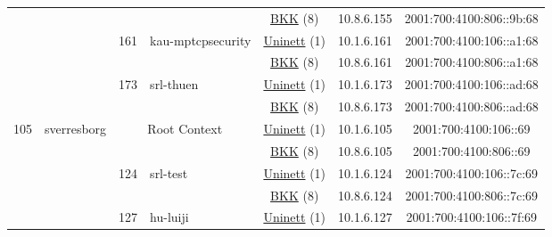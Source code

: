 \begin{small}
\begin{center}
\begin{longtable}{|c|c|c|c|c|c|c|c|}
  &  &  &  & \multicolumn{2}{|c|}{\tiny{\href{http://bkk.no}{BKK} (8)}} & \tiny{10.8.6.155} & \tiny{2001:700:4100:806::9b:68} \\* \cline{3-3}\cline{4-4}\cline{5-5}\cline{6-6}\cline{7-7}\cline{8-8}
  &  & \multirow{2}{*}{\tiny{161}} & \multicolumn{1}{|l|}{\multirow{2}{*}{\tiny{kau-mptcpsecurity}}} & \multicolumn{2}{|c|}{\tiny{\href{https://www.uninett.no}{Uninett} (1)}} & \tiny{10.1.6.161} & \tiny{2001:700:4100:106::a1:68} \\* \cline{5-5}\cline{6-6}\cline{7-7}\cline{8-8}
  &  &  &  & \multicolumn{2}{|c|}{\tiny{\href{http://bkk.no}{BKK} (8)}} & \tiny{10.8.6.161} & \tiny{2001:700:4100:806::a1:68} \\* \cline{3-3}\cline{4-4}\cline{5-5}\cline{6-6}\cline{7-7}\cline{8-8}
  &  & \multirow{2}{*}{\tiny{173}} & \multicolumn{1}{|l|}{\multirow{2}{*}{\tiny{srl-thuen}}} & \multicolumn{2}{|c|}{\tiny{\href{https://www.uninett.no}{Uninett} (1)}} & \tiny{10.1.6.173} & \tiny{2001:700:4100:106::ad:68} \\* \cline{5-5}\cline{6-6}\cline{7-7}\cline{8-8}
  &  &  &  & \multicolumn{2}{|c|}{\tiny{\href{http://bkk.no}{BKK} (8)}} & \tiny{10.8.6.173} & \tiny{2001:700:4100:806::ad:68} \\ \hline
 \multirow{26}{*}{\tiny{105}} & \multicolumn{1}{|l|}{\multirow{26}{*}{\tiny{sverresborg}}} & \multicolumn{2}{|c|}{\multirow{2}{*}{\tiny{Root Context}}} & \multicolumn{2}{|c|}{\tiny{\href{https://www.uninett.no}{Uninett} (1)}} & \tiny{10.1.6.105} & \tiny{2001:700:4100:106::69} \\* \cline{5-5}\cline{6-6}\cline{7-7}\cline{8-8}
  &  & \multicolumn{2}{|c|}{} & \multicolumn{2}{|c|}{\tiny{\href{http://bkk.no}{BKK} (8)}} & \tiny{10.8.6.105} & \tiny{2001:700:4100:806::69} \\* \cline{3-3}\cline{4-4}\cline{5-5}\cline{6-6}\cline{7-7}\cline{8-8}
  &  & \multirow{2}{*}{\tiny{124}} & \multicolumn{1}{|l|}{\multirow{2}{*}{\tiny{srl-test}}} & \multicolumn{2}{|c|}{\tiny{\href{https://www.uninett.no}{Uninett} (1)}} & \tiny{10.1.6.124} & \tiny{2001:700:4100:106::7c:69} \\* \cline{5-5}\cline{6-6}\cline{7-7}\cline{8-8}
  &  &  &  & \multicolumn{2}{|c|}{\tiny{\href{http://bkk.no}{BKK} (8)}} & \tiny{10.8.6.124} & \tiny{2001:700:4100:806::7c:69} \\* \cline{3-3}\cline{4-4}\cline{5-5}\cline{6-6}\cline{7-7}\cline{8-8}
  &  & \multirow{2}{*}{\tiny{127}} & \multicolumn{1}{|l|}{\multirow{2}{*}{\tiny{hu-luiji}}} & \multicolumn{2}{|c|}{\tiny{\href{https://www.uninett.no}{Uninett} (1)}} & \tiny{10.1.6.127} & \tiny{2001:700:4100:106::7f:69} \\* \cline{5-5}\cline{6-6}\cline{7-7}\cline{8-8}

\end{longtable}
\end{center}
\end{small}
